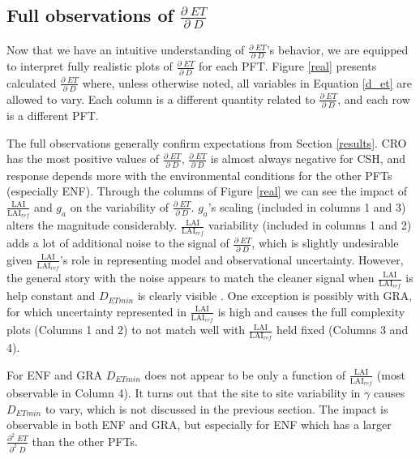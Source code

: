 \documentclass[draft,linenumbers]{agujournal}
\begin{document}
\subsection{Full observations of $\frac{\partial \; ET}{\partial \; D}$}

Now that we have an intuitive understanding of $\frac{\partial \; ET}{\partial \; D}$'s behavior, we are equipped to interpret fully realistic plots of $\frac{\partial \; ET}{\partial \; D}$ for each PFT. Figure \ref{real} presents calculated $\frac{\partial \; ET}{\partial \; D}$ where, unless otherwise noted, all variables in Equation \ref{d_et} are allowed to vary. Each column is a different quantity related to $\frac{\partial \; ET}{\partial \; D}$, and each row is a different PFT.

The full observations generally confirm expectations from Section \ref{results}. CRO has the most positive values of $\frac{\partial \; ET}{\partial \; D}$, $\frac{\partial \; ET}{\partial \; D}$ is almost always negative for CSH, and response depends more with the environmental conditions for the other PFTs (especially ENF). Through the columns of Figure \ref{real} we can see the impact of $\frac{\text{LAI}}{\text{LAI$_{ref}$}}$ and $g_a$ on the variability of $\frac{\partial \; ET}{\partial \; D}$. $g_a$'s scaling (included in columns 1 and 3) alters the magnitude considerably. $\frac{\text{LAI}}{\text{LAI$_{ref}$}}$ variability (included in columns 1 and 2) adds a lot of additional noise to the signal of $\frac{\partial \; ET}{\partial \; D}$, which is slightly undesirable given $\frac{\text{LAI}}{\text{LAI$_{ref}$}}$'s role in representing model and observational uncertainty. However, the general story with the noise appears to match the cleaner signal when $\frac{\text{LAI}}{\text{LAI$_{ref}$}}$ is help constant and $D_{ETmin}$ is clearly visible . One exception is possibly with GRA, for which uncertainty represented in $\frac{\text{LAI}}{\text{LAI$_{ref}$}}$ is high and causes the full complexity plots (Columns 1 and 2) to not match well with $\frac{\text{LAI}}{\text{LAI$_{ref}$}}$ held fixed (Columns 3 and 4).

For ENF and GRA $D_{ETmin}$ does not appear to be only a function of $\frac{\text{LAI}}{\text{LAI$_{ref}$}}$ (most observable in Column 4). It turns out that the site to site variability in $\gamma$ causes $D_{ETmin}$ to vary, which is not discussed in the previous section. The impact is observable in both ENF and GRA, but especially for ENF which has a larger $\frac{\partial^2 \; ET}{\partial^2 \; D}$ than the other PFTs. 
\end{document}
